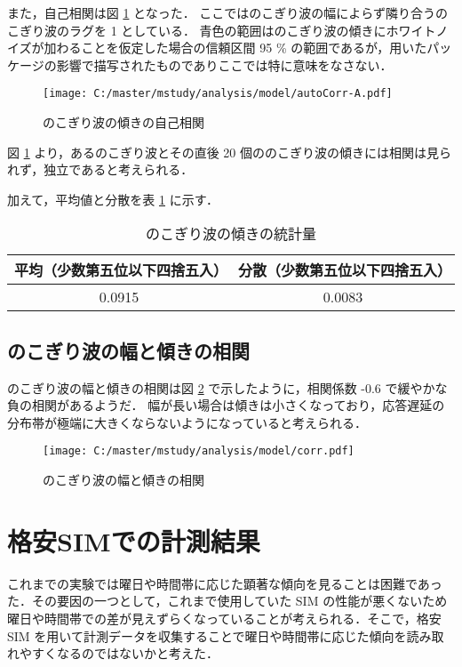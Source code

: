 \documentclass[a4j]{jarticle}
\begin{document}
また，自己相関は図 \ref{autoCorr-inc} となった．
ここではのこぎり波の幅によらず隣り合うのこぎり波のラグを 1 としている．
青色の範囲はのこぎり波の傾きにホワイトノイズが加わることを仮定した場合の信頼区間 95 \% の範囲であるが，用いたパッケージの影響で描写されたものでありここでは特に意味をなさない．
\begin{figure}[tb]
\begin{center}
\texttt{[image: C:/master/mstudy/analysis/model/autoCorr-A.pdf]}
\caption{のこぎり波の傾きの自己相関}
\label{autoCorr-inc}
\end{center}
\end{figure}
図 \ref{autoCorr-inc} より，あるのこぎり波とその直後 20 個ののこぎり波の傾きには相関は見られず，独立であると考えられる．

加えて，平均値と分散を表 \ref{stat-inc} に示す．
\begin{table}[tb]
\begin{center}
\caption{のこぎり波の傾きの統計量}
\label{stat-inc}
\begin{tabular}{|c|c|}
\hline
平均（少数第五位以下四捨五入）&分散（少数第五位以下四捨五入）\\
\hline
0.0915&0.0083\\
\hline
\end{tabular}
\end{center}
\end{table}
\subsection{のこぎり波の幅と傾きの相関}
のこぎり波の幅と傾きの相関は図 \ref{corr} で示したように，相関係数 -0.6 で緩やかな負の相関があるようだ．
幅が長い場合は傾きは小さくなっており，応答遅延の分布帯が極端に大きくならないようになっていると考えられる．
\begin{figure}[tb]
\begin{center}
\texttt{[image: C:/master/mstudy/analysis/model/corr.pdf]}
\caption{のこぎり波の幅と傾きの相関}
\label{corr}
\end{center}
\end{figure}

\section{格安SIMでの計測結果}
これまでの実験では曜日や時間帯に応じた顕著な傾向を見ることは困難であった．その要因の一つとして，これまで使用していた SIM の性能が悪くないため曜日や時間帯での差が見えずらくなっていることが考えられる．そこで，格安 SIM を用いて計測データを収集することで曜日や時間帯に応じた傾向を読み取れやすくなるのではないかと考えた．
\end{document}
